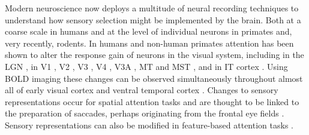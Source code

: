 Modern neuroscience now deploys a multitude of neural recording techniques to understand how sensory selection might be implemented by the brain. Both at a coarse scale in humans and at the level of individual neurons in primates and, very recently, rodents. In humans and non-human primates attention has been shown to alter the response gain of neurons in the visual system, including in the LGN \citep{OConnor2002-mx}, in V1 \citep{Motter1993-av}, V2 \citep{Buffalo2010-lr,Luck1997-sq,Motter1993-av}, V3 \citep{Liu2007-jx,Pestilli2011-gi,Saenz2002-fs,Silver2007-vd}, V4 \citep{Buffalo2010-lr,Connor1996-nm,Luck1997-sq,McAdams1999-jy,Moran1985-cv,Motter1993-av,Reynolds2000-mg,Spitzer1988-ib}, V3A \citep{Serences2007-le},  MT \citep{Beauchamp1997-rh,OCraven1997-ej,Saenz2002-fs,Seidemann1999-oz,Serences2007-le,Treue1999-mp,Treue1996-ez} and MST \citep{OCraven1997-ej,Treue1996-ez}, and in IT cortex \citep{Chelazzi1998-gx,Moran1985-cv}. Using BOLD imaging these changes can be observed simultaneously throughout almost all of early visual cortex \citep{Liu2007-jx,Pestilli2011-gi,Saenz2002-fs,Silver2007-vd} and ventral temporal cortex \citep{Baldauf2014-uj}. Changes to sensory representations occur for spatial attention tasks \citep{Klein2014-oe,McAdams1999-jy,Mitchell2009-do,Pestilli2011-gi,Womelsdorf2006-np} and are thought to be linked to the preparation of saccades, perhaps originating from the frontal eye fields \citep{Moore2003-fs}. Sensory representations can also be modified in  feature-based attention tasks \citep{Baldauf2014-uj,Harel2014-wd,Huk2000-uj,Jehee2011-mb,Saenz2002-fs,Saenz2003-qz,Serences2007-le,Treue1999-mp}.

